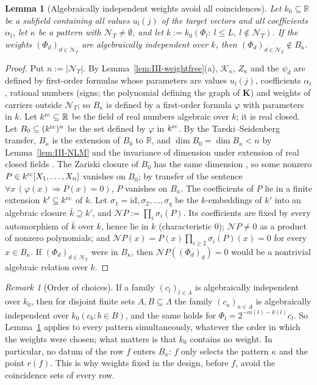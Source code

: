 \documentclass[10pt]{amsart}
\newtheorem{lemma}[theorem]{Lemma}
\theoremstyle{definition}
\theoremstyle{remark}
\newtheorem{remark}[theorem]{Remark}
\newcommand{\R}{\mathbb R}
\begin{document}
\begin{lemma}[Algebraically independent weights avoid all coincidences]\label{lem:III-GEN}
Let $k_0\subseteq\R$ be a subfield containing all values $u_l(j)$ of the target
vectors and all coefficients $\alpha_l$, let $\kappa$ be a pattern with
$\mathcal N_T\ne\emptyset$, and let $k:=k_0(\Phi_l:\ l\le L,\ l\notin\mathcal
N_T)$.  If the weights $(\Phi_d)_{d\in\mathcal N_T}$ are algebraically
independent over $k$, then $(\Phi_d)_{d\in\mathcal N_T}\notin B_\kappa$.
\end{lemma}

\begin{proof}
Put $n:=|\mathcal N_T|$.  By Lemma~\ref{lem:III-weightfree}(a), $\mathcal K_\kappa$,
$Z_\kappa$ and the $\psi_d$ are defined by first-order formulas whose
parameters are values $u_l(j)$, coefficients $\alpha_l$, rational numbers
(signs; the polynomial defining the graph of $\mathbf K$) and weights of
carriers outside $\mathcal N_T$; so $B_\kappa$ is defined by a first-order
formula $\varphi$ with parameters in $k$.  Let $k^{\rm rc}\subseteq\R$ be the
field of real numbers algebraic over $k$; it is real closed.  Let $B_0\subseteq
(k^{\rm rc})^n$ be the set defined by $\varphi$ in $k^{\rm rc}$.  By the
Tarski--Seidenberg transfer, $B_\kappa$ is the extension of $B_0$ to $\R$, and
$\dim B_0=\dim B_\kappa<n$ by Lemma~\ref{lem:III-NLM} and the invariance of
dimension under extension of real closed fields \cite[Chapter~5]{BCR}.  The
Zariski closure of $B_0$ has the same dimension \cite[Section~2.8]{BCR}, so
some nonzero $P\in k^{\rm rc}[X_1,\dots,X_n]$ vanishes on $B_0$; by transfer
of the sentence $\forall x\,(\varphi(x)\Rightarrow P(x)=0)$, $P$ vanishes on
$B_\kappa$.  The coefficients of $P$ lie in a finite extension $k'\subseteq
k^{\rm rc}$ of $k$.  Let $\sigma_1=\mathrm{id},\sigma_2,\dots,\sigma_q$ be the
$k$-embeddings of $k'$ into an algebraic closure $\bar k\supseteq k'$, and
$\mathcal NP:=\prod_i\sigma_i(P)$.  Its coefficients are fixed by every
automorphism of $\bar k$ over $k$, hence lie in $k$ (characteristic $0$);
$\mathcal NP\ne0$ as a product of nonzero polynomials; and $\mathcal
NP(x)=P(x)\prod_{i\ge2}\sigma_i(P)(x)=0$ for every $x\in B_\kappa$.  If
$(\Phi_d)_{d\in\mathcal N_T}$ were in $B_\kappa$, then $\mathcal NP((\Phi_d)_d)=0$
would be a nontrivial algebraic relation over $k$.
\end{proof}

\begin{remark}[Order of choices]\label{rem:III-GENorder}
If a family $(c_l)_{l\in\Lambda}$ is algebraically independent over $k_0$, then
for disjoint finite sets $A,B\subseteq\Lambda$ the family $(c_a)_{a\in A}$ is
algebraically independent over $k_0(c_b:b\in B)$, and the same holds for
$\Phi_l=2^{-m(l)-k(l)}c_l$.  So Lemma~\ref{lem:III-GEN} applies to every
pattern simultaneously, whatever the order in which the weights were chosen;
what matters is that $k_0$ contains no weight.  In particular, no datum of
the row $f$ enters $B_\kappa$: $f$ only selects the pattern $\kappa$ and the
point $r(f)$.  This is why weights fixed in the design, before $f$, avoid
the coincidence sets of every row.
\end{remark}
\end{document}
